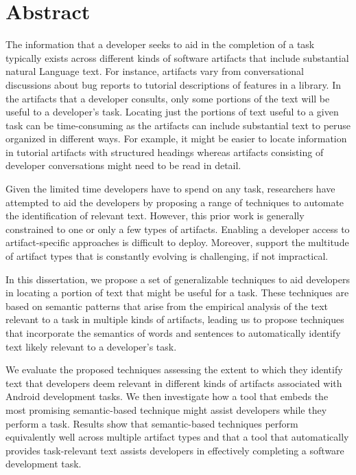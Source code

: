

\chapter*{Abstract}

The information that a developer seeks to aid in the completion of a task typically exists across different kinds of software artifacts that include substantial natural Language text. For instance,
artifacts vary from conversational discussions about bug reports to tutorial descriptions of features in a library.
In the artifacts that a developer consults, only some portions of the text will be useful to a developer's task. Locating just the portions of text useful to a given task can be time-consuming as the artifacts can include substantial text to peruse organized in different ways. For example, it might be easier to locate information
in tutorial artifacts with structured headings whereas artifacts consisting of developer conversations might need to be read in detail. 


Given the limited time developers have to spend on any task, researchers have 
attempted to aid the developers by proposing a range of techniques to automate the identification of relevant text. 
However, this prior work is generally constrained to one or only a few types of artifacts.  
Enabling a developer access to artifact-specific approaches is difficult to deploy. 
Moreover, support the multitude of artifact types that is constantly evolving
is challenging, if not impractical.

In this dissertation, we propose a set of generalizable techniques to aid developers in locating a portion of text that might be useful for a task. These techniques are based on semantic patterns that arise from the empirical analysis of the text relevant to a task in multiple kinds of artifacts, leading us to propose techniques that incorporate the semantics of words and sentences to automatically identify text likely relevant to a developer's task.

We evaluate the proposed techniques assessing the extent to which they identify text that developers deem relevant in different kinds of artifacts associated with Android development tasks. We then investigate how a tool that embeds the most promising semantic-based technique might assist developers while they perform a task. Results show that semantic-based techniques perform equivalently well across multiple artifact types and that a tool that automatically provides task-relevant text assists developers in effectively completing a software development task.
    

